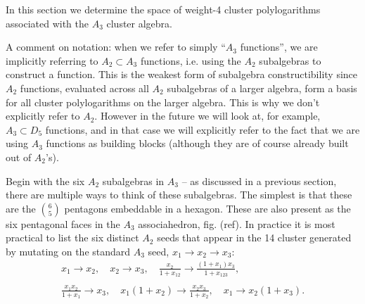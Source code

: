 \documentclass[12pt]{article}
\begin{document}
\thispagestyle{fancyplain}
 
\fancyhf{}
 
\cfoot{\fancyplain{}{\thepage}}


In this section we determine the space of weight-4 cluster polylogarithms associated with the $A_3$ cluster algebra. 

A comment on notation: when we refer to simply ``$A_3$ functions'', we are implicitly referring to $A_2 \subset A_3$ functions, i.e. using the $A_2$ subalgebras to construct a function. This is the weakest form of subalgebra constructibility since $A_2$ functions, evaluated across all $A_2$ subalgebras of a larger algebra, form a basis for all cluster polylogarithms on the larger algebra. This is why we don't explicitly refer to $A_2$. However in the future we will look at, for example, $A_3 \subset D_5$ functions, and in that case we will explicitly refer to the fact that we are using $A_3$ functions as building blocks (although they are of course already built out of $A_2$'s). 

Begin with the six $A_2$ subalgebras in $A_3$ -- as discussed in a previous section, there are multiple ways to think of these subalgebras. The simplest is that these are the $\binom{6}{5}$ pentagons embeddable in a hexagon. These are also present as the six pentagonal faces in the $A_3$ associahedron, fig. (ref). In practice it is most practical to list the six distinct $A_2$ seeds that appear in the 14 cluster generated by mutating on the standard $A_3$ seed, $x_1 \to x_2 \to x_3$:
\begin{equation}\label{eq:a2-in-a3}
\begin{gathered}
	x_1 \to x_2, \quad 
	x_2 \to x_3, \quad 
	\frac{x_2}{1+x_{12}}\to \frac{\left(1+x_1\right) x_3}{1+x_{123}},\\ \\
	\frac{x_1 x_2}{1+x_1}\to x_3,\quad 
	x_1 \left(1+x_2\right)\to \frac{x_2 x_3}{1+x_2},\quad
	 x_1\to x_2 \left(1+x_3\right).
\end{gathered}	
\end{equation}
\end{document}
